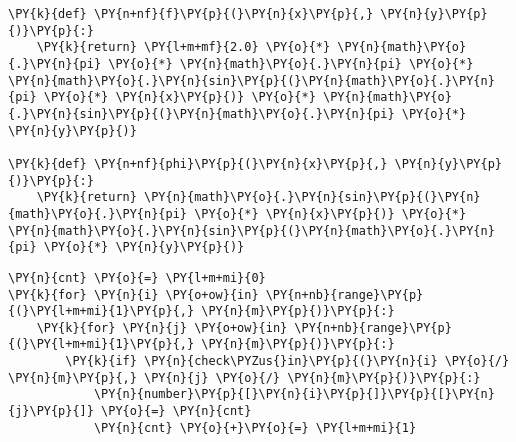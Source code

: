     \begin{tcolorbox}[breakable, size=fbox, boxrule=1pt, pad at break*=1mm,colback=cellbackground, colframe=cellborder]
\begin{Verbatim}[commandchars=\\\{\}]
\PY{k}{def} \PY{n+nf}{f}\PY{p}{(}\PY{n}{x}\PY{p}{,} \PY{n}{y}\PY{p}{)}\PY{p}{:}
    \PY{k}{return} \PY{l+m+mf}{2.0} \PY{o}{*} \PY{n}{math}\PY{o}{.}\PY{n}{pi} \PY{o}{*} \PY{n}{math}\PY{o}{.}\PY{n}{pi} \PY{o}{*} \PY{n}{math}\PY{o}{.}\PY{n}{sin}\PY{p}{(}\PY{n}{math}\PY{o}{.}\PY{n}{pi} \PY{o}{*} \PY{n}{x}\PY{p}{)} \PY{o}{*} \PY{n}{math}\PY{o}{.}\PY{n}{sin}\PY{p}{(}\PY{n}{math}\PY{o}{.}\PY{n}{pi} \PY{o}{*} \PY{n}{y}\PY{p}{)}

\PY{k}{def} \PY{n+nf}{phi}\PY{p}{(}\PY{n}{x}\PY{p}{,} \PY{n}{y}\PY{p}{)}\PY{p}{:}
    \PY{k}{return} \PY{n}{math}\PY{o}{.}\PY{n}{sin}\PY{p}{(}\PY{n}{math}\PY{o}{.}\PY{n}{pi} \PY{o}{*} \PY{n}{x}\PY{p}{)} \PY{o}{*} \PY{n}{math}\PY{o}{.}\PY{n}{sin}\PY{p}{(}\PY{n}{math}\PY{o}{.}\PY{n}{pi} \PY{o}{*} \PY{n}{y}\PY{p}{)}
\end{Verbatim}
\end{tcolorbox}

    \begin{tcolorbox}[breakable, size=fbox, boxrule=1pt, pad at break*=1mm,colback=cellbackground, colframe=cellborder]
\begin{Verbatim}[commandchars=\\\{\}]
\PY{n}{cnt} \PY{o}{=} \PY{l+m+mi}{0}
\PY{k}{for} \PY{n}{i} \PY{o+ow}{in} \PY{n+nb}{range}\PY{p}{(}\PY{l+m+mi}{1}\PY{p}{,} \PY{n}{m}\PY{p}{)}\PY{p}{:}
    \PY{k}{for} \PY{n}{j} \PY{o+ow}{in} \PY{n+nb}{range}\PY{p}{(}\PY{l+m+mi}{1}\PY{p}{,} \PY{n}{m}\PY{p}{)}\PY{p}{:}
        \PY{k}{if} \PY{n}{check\PYZus{}in}\PY{p}{(}\PY{n}{i} \PY{o}{/} \PY{n}{m}\PY{p}{,} \PY{n}{j} \PY{o}{/} \PY{n}{m}\PY{p}{)}\PY{p}{:}
            \PY{n}{number}\PY{p}{[}\PY{n}{i}\PY{p}{]}\PY{p}{[}\PY{n}{j}\PY{p}{]} \PY{o}{=} \PY{n}{cnt}
            \PY{n}{cnt} \PY{o}{+}\PY{o}{=} \PY{l+m+mi}{1}
\end{Verbatim}
\end{tcolorbox}

